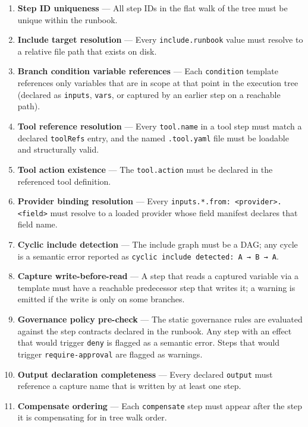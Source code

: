 \begin{enumerate}
  \item \textbf{Step ID uniqueness} — All step IDs in the flat walk of the tree
        must be unique within the runbook.
  \item \textbf{Include target resolution} — Every \texttt{include.runbook} value
        must resolve to a relative file path that exists on disk.
  \item \textbf{Branch condition variable references} — Each \texttt{condition}
        template references only variables that are in scope at that point in the
        execution tree (declared as \texttt{inputs}, \texttt{vars}, or captured
        by an earlier step on a reachable path).
  \item \textbf{Tool reference resolution} — Every \texttt{tool.name} in a tool
        step must match a declared \texttt{toolRefs} entry, and the named
        \texttt{.tool.yaml} file must be loadable and structurally valid.
  \item \textbf{Tool action existence} — The \texttt{tool.action} must be
        declared in the referenced tool definition.
  \item \textbf{Provider binding resolution} — Every \texttt{inputs.*.from:
        <provider>.<field>} must resolve to a loaded provider whose field
        manifest declares that field name.
  \item \textbf{Cyclic include detection} — The include graph must be a DAG;
        any cycle is a semantic error reported as \texttt{cyclic include detected: A → B → A}.
  \item \textbf{Capture write-before-read} — A step that reads a captured
        variable via a template must have a reachable predecessor step that
        writes it; a warning is emitted if the write is only on some branches.
  \item \textbf{Governance policy pre-check} — The static governance rules are
        evaluated against the step contracts declared in the runbook.  Any
        step with an effect that would trigger \texttt{deny} is flagged as a
        semantic error.  Steps that would trigger \texttt{require-approval} are
        flagged as warnings.
  \item \textbf{Output declaration completeness} — Every declared \texttt{output}
        must reference a capture name that is written by at least one step.
  \item \textbf{Compensate ordering} — Each \texttt{compensate} step must appear
        after the step it is compensating for in tree walk order.
\end{enumerate}

